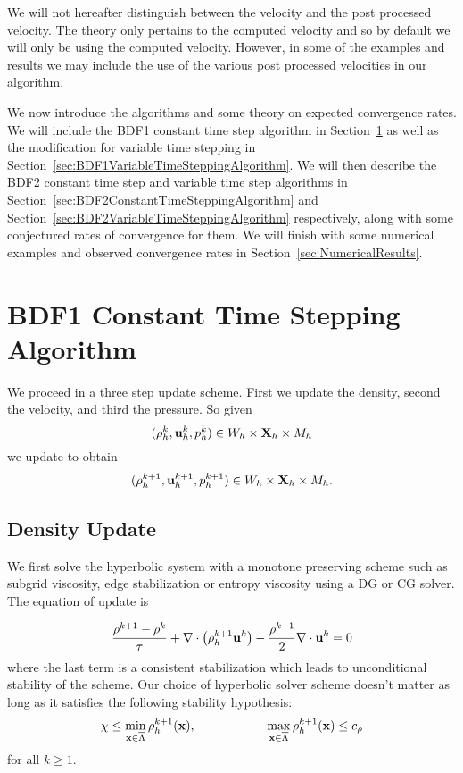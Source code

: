 \documentclass[letterpaper]{erdc}
\begin{document}
\begin{remark}
We will not hereafter distinguish between the velocity and the post processed velocity.  The theory only pertains to the computed velocity and so by default we will only be using the computed velocity.  However, in some of the examples and results we may include the use of the various post processed velocities in our algorithm.
\end{remark}

We now introduce the algorithms and some theory on expected convergence rates.  We will include the BDF1 constant time step algorithm in Section~\ref{sec:BDF1ConstantTimeSteppingAlgorithm} as well as the modification for variable time stepping in Section~\ref{sec:BDF1VariableTimeSteppingAlgorithm}.  We will then describe the BDF2 constant time step and variable time step algorithms in Section~\ref{sec:BDF2ConstantTimeSteppingAlgorithm} and Section~\ref{sec:BDF2VariableTimeSteppingAlgorithm} respectively, along with some conjectured rates of convergence for them.  We will finish with some numerical examples and observed convergence rates in Section~\ref{sec:NumericalResults}.

%
%
%
\section{BDF1 Constant Time Stepping Algorithm}\label{sec:BDF1ConstantTimeSteppingAlgorithm}
We proceed in a three step update scheme.  First we update the density,  second the velocity, and third the pressure.  So given
\begin{equation}(\rho^{k}_h, \textbf{u}^{k}_{h}, p^{k}_h) \in W_h\times\textbf{X}_h\times M_h  \end{equation}
we update to obtain
\begin{equation}(\rho^{k+1}_h, \textbf{u}^{k+1}_{h}, p^{k+1}_h) \in W_h\times\textbf{X}_h\times M_h.\end{equation}

%
%
\subsection{Density Update}

We first solve the hyperbolic system with a monotone preserving scheme such as subgrid viscosity, edge stabilization or entropy viscosity using a DG or CG solver.  The equation of update is

\begin{equation}
  \frac{\rho^{k+1} - \rho^k}{\tau} + \nabla\cdot\left(\rho_h^{k+1}\textbf{u}^{k} \right) - \frac{\rho^{k+1}}{2}\nabla\cdot\textbf{u}^{k} = 0
\end{equation}
where the last term is a consistent stabilization which leads to unconditional stability of the scheme.   Our choice of hyperbolic solver scheme doesn't matter as long as it satisfies the following stability hypothesis:
\begin{equation}
  \chi \leq \displaystyle\min_{\textbf{x}\in\overline{\Lambda}} \rho_h^{k+1}(\textbf{x}), \hspace{2cm} \displaystyle\max_{\textbf{x}\in\overline{\Lambda}} \rho_{h}^{k+1}(\textbf{x}) \leq c_{\rho}
\end{equation}
for all $k\geq 1$.
\end{document}
